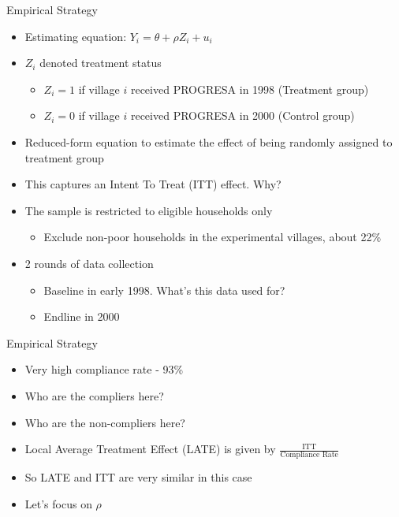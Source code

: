 \documentclass[11pt,notes=hide,aspectratio=169,mathserif]{beamer}
\begin{document}
\begin{frame}{Empirical Strategy}
\begin{itemize}
\item Estimating equation: $Y_i =  \theta + \rho Z_i + u_i $
\item $Z_i$ denoted treatment status 
\begin{itemize}
\item $Z_i = 1$ if village $i$ received PROGRESA in 1998 (Treatment group)
\item $Z_i = 0$ if village $i$ received PROGRESA in 2000 (Control group)
\end{itemize}
\item Reduced-form equation to estimate the effect of being randomly assigned to treatment group 
\item This captures an Intent To Treat (ITT) effect. Why? 
\item The sample is restricted to eligible households only
\begin{itemize}
    \item Exclude non-poor households in the experimental villages, about 22\%
\end{itemize}
\item 2 rounds of data collection
\begin{itemize}
    \item Baseline in early 1998. What's this data used for? 
    \item Endline in 2000
\end{itemize}
\end{itemize}
\end{frame}

\begin{frame}{Empirical Strategy}
\begin{itemize}
\item Very high compliance rate - 93\%
\item Who are the compliers here?
\item Who are the non-compliers here?
\item Local Average Treatment Effect (LATE) is given by $\frac{\text{ITT}}{\text{Compliance Rate}}$
\item So LATE and ITT are very similar in this case
\item Let's focus on $\rho$
\end{itemize}
\end{frame}
\end{document}
